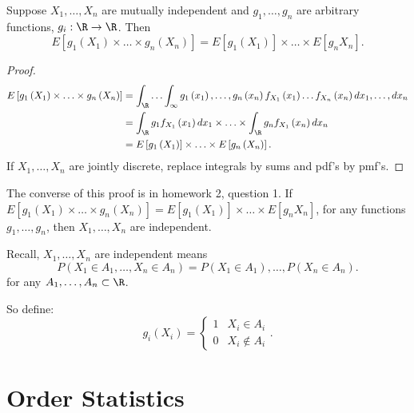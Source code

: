 
Suppose $X_{1} , \ldots , X_{n}$ are mutually independent and $g_{1} , \ldots , g_{n}$ are arbitrary functions, $g_{i} : \R \to \R$. Then 
\[
	E\left[ g_1 \left( X_1 \right)  \times \ldots\times g_{n}\left( X_{n} \right)  \right] = E\left[ g_1 \left( X_1 \right)  \right] \times  \ldots \times E\left[ g_{n}X_{n} \right] 
.\]
\begin{proof}
	\begin{align*}
		E\left[ g_1 \left( X_1 \right)  \times \ldots\times g_{n}\left( X_{n} \right)  \right] &= 
		\int_{\R}^{ } \ldots \int_{\infty}^{ }  g_{1}\left( x_1 \right)  , \ldots , g_{n}\left( x_{n} \right)  f_{X_1}\left( x_{1} \right) \ldots f_{X_{n}}\left( x_{n} \right) dx_{1} , \ldots , dx_{n} \\
												       &= \int_{\R}^{ } g_1 f_{X_1}\left( x_1 \right) dx_1\times  \ldots\times  \int_{\R}^{ } g_{n}f_{X_1}\left( x_{n} \right) dx_{n}    \\
												       &= E\left[ g_1 \left( X_1 \right)  \right] \times \ldots \times E\left[ g_n \left( X_{n} \right)  \right]  
	.\end{align*} 
	If $X_1 , \ldots, X_{n}$ are jointly discrete, replace integrals by sums and pdf's by pmf's.
\end{proof}

The converse of this proof is in homework 2, question 1. If $E\left[ g_1 \left( X_1 \right)  \times \ldots\times g_{n}\left( X_{n} \right)  \right] = E\left[ g_1 \left( X_1 \right)  \right] \times  \ldots \times E\left[ g_{n}X_{n} \right]$, for any functions $g_{1} , \ldots , g_{n}$, then $X_{1} , \ldots , X_{n}$ are independent. 

Recall, $X_{1} , \ldots , X_{n}$ are independent means 
\[
	P\left( X_1 \in  A_1, \ldots, X_{n} \in  A_{n} \right) = P\left( X_{1} \in  A_1  \right), \ldots, P\left( X_{n} \in  A_n \right)  
.\] 
for any $A_{1} , \ldots , A_{n} \subset  \R$.

So define:
\[
g_{i}\left( X_{i} \right)  = \begin{cases}
	1 & X_{i} \in  A_{i}\\
	0 & X_{i }\not \in A_{i}
\end{cases}
.\] 

\section{Order Statistics}

